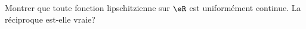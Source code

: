 
\begin{exercice}\label{exo0100}

	Montrer que toute fonction lipschitzienne sur $\eR$ est uniformément continue. La réciproque est-elle vraie?

\end{exercice}
